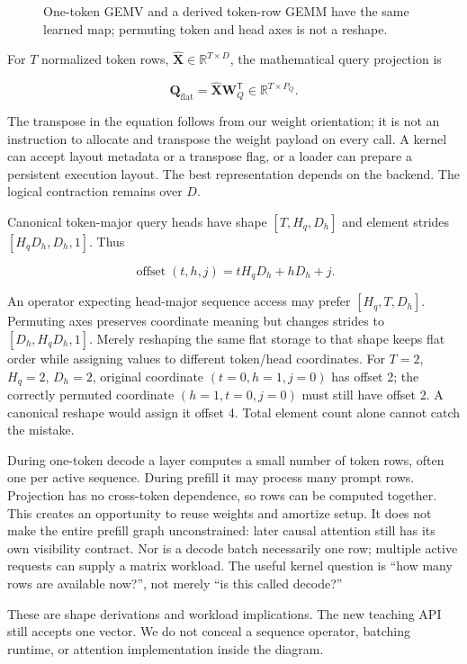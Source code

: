 \documentclass[
  10pt,
]{article}
\begin{document}
\begin{figure}[H]\centering\resizebox{\linewidth}{!}{}\caption{One-token GEMV and a derived token-row GEMM have the same learned map; permuting token and head axes is not a reshape.}\end{figure}

For \(T\) normalized token rows,
\(\widehat{\mathbf{X}}\in\mathbb{R}^{T\times D}\), the mathematical
query projection is

\[
\mathbf{Q}_{\mathrm{flat}}=
\widehat{\mathbf{X}}\mathbf{W}_Q^{\mathsf T}
\in\mathbb{R}^{T\times P_Q}.
\]

The transpose in the equation follows from our weight orientation; it is
not an instruction to allocate and transpose the weight payload on every
call. A kernel can accept layout metadata or a transpose flag, or a
loader can prepare a persistent execution layout. The best
representation depends on the backend. The logical contraction remains
over \(D\).

Canonical token-major query heads have shape \([T,H_q,D_h]\) and element
strides \([H_qD_h,D_h,1]\). Thus

\[
\operatorname{offset}(t,h,j)=tH_qD_h+hD_h+j.
\]

An operator expecting head-major sequence access may prefer
\([H_q,T,D_h]\). Permuting axes preserves coordinate meaning but changes
strides to \([D_h,H_qD_h,1]\). Merely reshaping the same flat storage to
that shape keeps flat order while assigning values to different
token/head coordinates. For \(T=2\), \(H_q=2\), \(D_h=2\), original
coordinate \((t=0,h=1,j=0)\) has offset 2; the correctly permuted
coordinate \((h=1,t=0,j=0)\) must still have offset 2. A canonical
reshape would assign it offset 4. Total element count alone cannot catch
the mistake.

During one-token decode a layer computes a small number of token rows,
often one per active sequence. During prefill it may process many prompt
rows. Projection has no cross-token dependence, so rows can be computed
together. This creates an opportunity to reuse weights and amortize
setup. It does not make the entire prefill graph unconstrained: later
causal attention still has its own visibility contract. Nor is a decode
batch necessarily one row; multiple active requests can supply a matrix
workload. The useful kernel question is ``how many rows are available
now?'', not merely ``is this called decode?''

These are shape derivations and workload implications. The new teaching
API still accepts one vector. We do not conceal a sequence operator,
batching runtime, or attention implementation inside the diagram.
\end{document}
